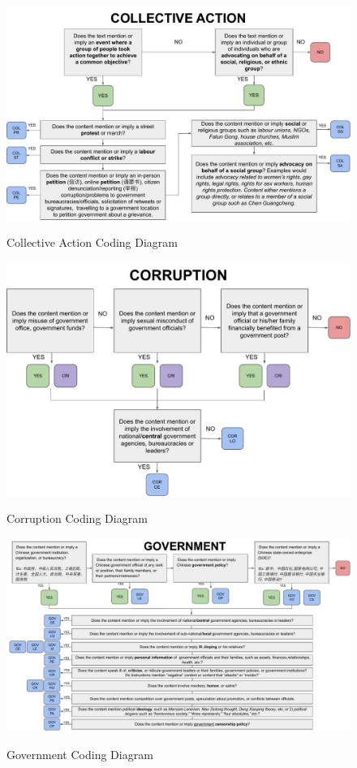 \documentclass[12pt]{article}
\begin{document}
\begin{CJK*}{UTF8}{gbsn}
{
\begin{figure}[H]
	\centering
	\caption{Collective Action Coding Diagram}
	\includegraphics[width=\textwidth]{figures/coding_COL.pdf}\\
	\label{COL}
\end{figure}
}

{
\begin{figure}[H]
	\centering
	\caption{Corruption Coding Diagram}
	\includegraphics[width=\textwidth]{figures/coding_COR.pdf}\\
	\label{COR}
\end{figure}
}

{
\begin{figure}[H]
	\centering
	\caption{Government Coding Diagram}
	\includegraphics[width=\textwidth]{figures/coding_GOV.pdf}\\
	\label{GOV}
\end{figure}
}


\end{CJK*}
\end{document}

